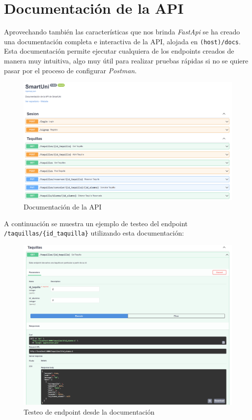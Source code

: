\documentclass[12pt]{report}
\begin{document}
\section{Documentación de la API}
Aprovechando también las características que nos brinda \textit{FastApi} se ha creado una documentación completa e interactiva de la API, alojada en \texttt{(host)/docs}.\\
Esta documentación permite ejecutar cualquiera de los endpoints creados de manera muy intuitiva, algo muy útil para realizar pruebas rápidas si no se quiere pasar por el proceso de configurar \textit{Postman}.
\begin{figure}[H]
    \centering
    \includegraphics[width=0.75\linewidth]{imagenes//documentacion/captura_documentacion.png}
    \caption{Documentación de la API}
    \label{fig:enter-label}
\end{figure}
A continuación se muestra un ejemplo de testeo del endpoint 
\texttt{/taquillas/\{id\_taquilla\}} utilizando esta documentación:
\begin{figure}[H]
    \centering
    \includegraphics[width=1\linewidth]{imagenes//documentacion/documentacion_testeo_endpoint.png}
    \caption{Testeo de endpoint desde la documentación}
    \label{fig:enter-label}
\end{figure}
\end{document}
